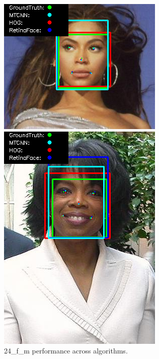 \documentclass{l4proj}
\begin{document}
\begin{appendices}
\begin{figure}[h!]
  \centering
  \begin{minipage}{0.49\textwidth}
    \centering
     \includegraphics[width=\textwidth]{images/appendix/24.png}
    \caption{24\_f\_m performance across algorithms.}
    \label{whoopi_result}
  \end{minipage}
    \hfill
    \begin{minipage}{0.49\textwidth}
    \centering
     \includegraphics[width=\textwidth]{images/appendix/25.png}

\end{minipage}
\end{figure}
\end{appendices}
\end{document}
